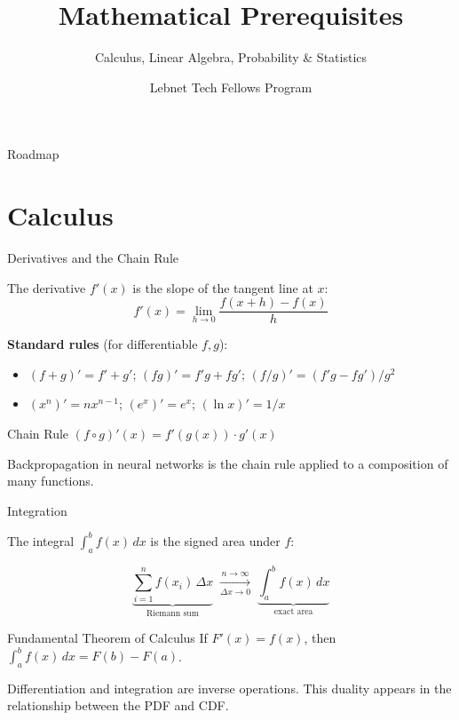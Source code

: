 \documentclass[aspectratio=169, professionalfonts]{beamer}
\title{Mathematical Prerequisites}
\subtitle{Calculus, Linear Algebra, Probability \& Statistics}
\author{Lebnet Tech Fellows Program}
\date{}
\begin{document}
\begin{frame}
\titlepage
\end{frame}

\begin{frame}{Roadmap}
\tableofcontents
\end{frame}

\section{Calculus}

\begin{frame}{Derivatives and the Chain Rule}

The derivative $f'(x)$ is the slope of the tangent line at $x$:
$$f'(x) = \lim_{h \to 0} \frac{f(x+h) - f(x)}{h}$$

\bigskip

\textbf{Standard rules} (for differentiable $f, g$):
\begin{itemize}
  \item $(f + g)' = f' + g'$; \quad $(fg)' = f'g + fg'$; \quad $(f/g)' = (f'g - fg')/g^2$
  \item $(x^n)' = nx^{n-1}$; \quad $(e^x)' = e^x$; \quad $(\ln x)' = 1/x$
\end{itemize}

\bigskip

\begin{alertblock}{Chain Rule}
$(f \circ g)'(x) = f'(g(x)) \cdot g'(x)$
\end{alertblock}

Backpropagation in neural networks is the chain rule applied to a composition of many functions.

\end{frame}

\begin{frame}{Integration}

The integral $\int_a^b f(x)\,dx$ is the signed area under $f$:

$$\underbrace{\sum_{i=1}^{n} f(x_i)\,\Delta x}_{\text{Riemann sum}} \;\xrightarrow[\Delta x \to 0]{n \to \infty}\; \underbrace{\int_a^b f(x)\,dx}_{\text{exact area}}$$

\bigskip

\begin{block}{Fundamental Theorem of Calculus}
If $F'(x) = f(x)$, then $\displaystyle\int_a^b f(x)\,dx = F(b) - F(a)$.
\end{block}

\bigskip

Differentiation and integration are inverse operations. This duality appears in the relationship between the PDF and CDF.

\end{frame}
\end{document}
